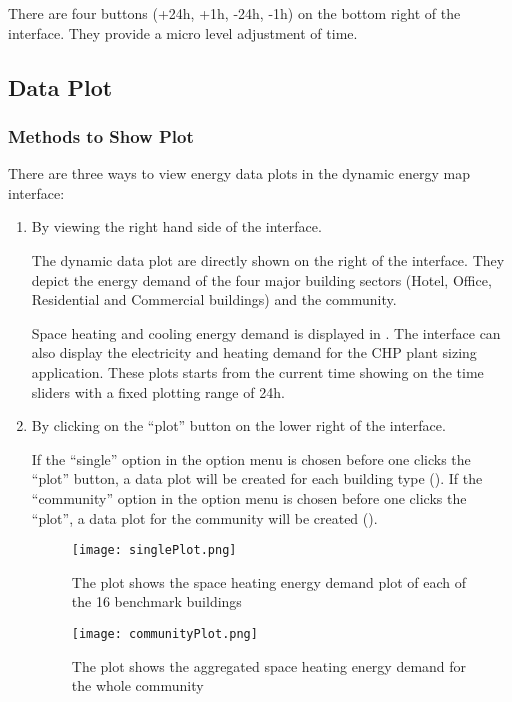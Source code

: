 There are four buttons (+24h, +1h, -24h, -1h) on the bottom right of
the interface. They provide a micro level adjustment of time.

\subsection{Data Plot}
\subsubsection{Methods to Show Plot}
There are three ways to view energy data plots in the dynamic energy
map interface:
\begin{enumerate}[1)]
\item By viewing the right hand side of the interface.

  The dynamic data plot are directly shown on the right of the
  interface. They depict the energy demand of the four major building
  sectors (Hotel, Office, Residential and Commercial buildings) and
  the community.

  Space heating and cooling energy demand is displayed in
  . The interface can also display the
  electricity and heating demand for the CHP plant sizing
  application. These plots starts from the current time showing on the
  time sliders with a fixed plotting range of 24h.

\item By clicking on the ``plot'' button on the lower right of the
  interface.

  If the ``single'' option in the option menu is chosen before one
  clicks the ``plot'' button, a data plot will be created for each
  building type (). If the ``community'' option
  in the option menu is chosen before one clicks the ``plot'', a data
  plot for the community will be created ().

  \begin{figure}[h!]
    \centering
    \texttt{[image: singlePlot.png]}
    \caption[Single Plots of 16 Building Types]{The plot shows the
      space heating energy demand plot of each of the 16 benchmark
      buildings}
    \label{fig:singlePlot}
  \end{figure}

  \begin{figure}[h!]
    \centering
    \texttt{[image: communityPlot.png]}
    \caption[Community Plot]{The plot shows the aggregated space
      heating energy demand for the whole community}
    \label{fig:communityPlot}
  \end{figure}


\end{enumerate}
